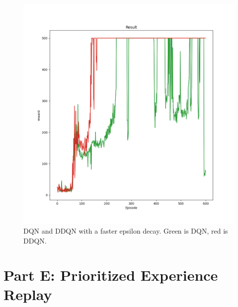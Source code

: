 \documentclass[10pt]{article}
\begin{document}
\begin{figure}[h!]
    \centering
    \includegraphics[scale=0.5]{dqn_green_ddqn_red_low_decay.png}
    \caption{DQN and DDQN with a faster epsilon decay. Green is DQN, red is DDQN.}
\end{figure}


\newpage

\section{Part E: Prioritized Experience Replay}
\end{document}
